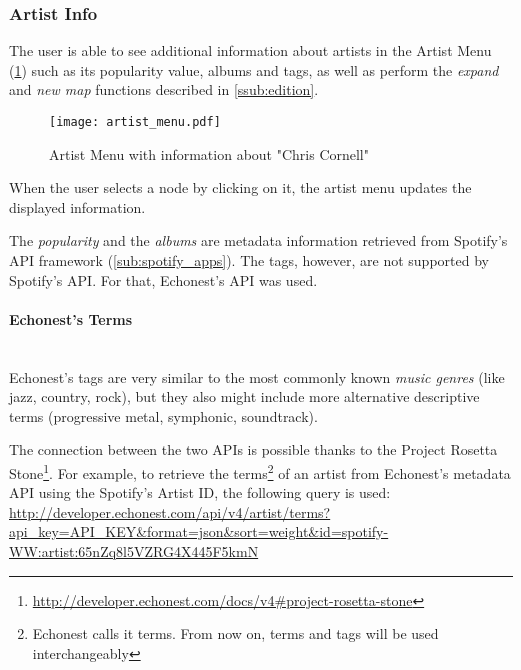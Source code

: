 
    \subsubsection{Artist Info} %
      \label{ssub:artist_info}
      The user is able to see additional information about artists in the Artist Menu (\ref{fig:artist_menu}) such as its popularity value, albums and tags, as well as perform the \emph{expand} and \emph{new map} functions described in \ref{ssub:edition}.

      \begin{figure}[tb]
        \begin{center}
          \texttt{[image: artist\_menu.pdf]}
        \end{center}
        \caption{Artist Menu with information about "Chris Cornell"}
        \label{fig:artist_menu}
      \end{figure}

      When the user selects a node by clicking on it, the artist menu updates the displayed information.

      The \emph{popularity} and the \emph{albums} are metadata information retrieved from Spotify's API framework (\ref{sub:spotify_apps}).
      The tags, however, are not supported by Spotify's API.
      For that, Echonest's API was used.

      \paragraph{Echonest's Terms} \hfill \\
      Echonest's tags are very similar to the most commonly known \emph{music genres} (like jazz, country, rock), but they also might include more alternative descriptive terms (progressive metal, symphonic, soundtrack).

      The connection between the two APIs is possible thanks to the Project Rosetta Stone\footnote{\url{http://developer.echonest.com/docs/v4\#project-rosetta-stone}}.
      For example, to retrieve the terms\footnote{Echonest calls it terms. From now on, terms and tags will be used interchangeably} of an artist from Echonest's metadata API using the Spotify's Artist ID, the following query is used: \\

      \url{
        http://developer.echonest.com/api/v4/artist/terms?api_key=API_KEY&format=json&sort=weight&id=spotify-WW:artist:65nZq8l5VZRG4X445F5kmN
      } \\

